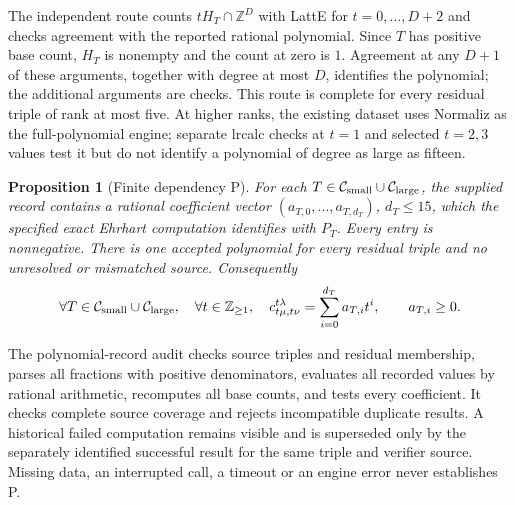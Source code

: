 \documentclass[11pt]{article}
\newtheorem{proposition}[theorem]{Proposition}
\begin{document}
The independent route counts $tH_T\cap\mathbb Z^D$ with LattE for
$t=0,\ldots,D+2$ and checks agreement with the reported rational
polynomial. Since $T$ has positive base count, $H_T$ is nonempty and
the count at zero is $1$. Agreement at any $D+1$ of these arguments,
together with degree at most $D$, identifies the polynomial; the
additional arguments are checks. This route is complete for every
residual triple of rank at most five. At higher ranks, the existing
dataset uses Normaliz as the full-polynomial engine; separate lrcalc
checks at $t=1$ and selected $t=2,3$ values test it but do not identify
a polynomial of degree as large as fifteen.

\begin{proposition}[Finite dependency P]\label{comp:P}
For each $T\in\mathcal C_{\rm small}\cup\mathcal C_{\rm large}$,
the supplied record contains a rational coefficient vector
$(a_{T,0},\ldots,a_{T,d_T})$, $d_T\le15$, which the specified exact
Ehrhart computation identifies with $P_T$. Every entry is nonnegative.
There is one accepted polynomial for every residual triple and no
unresolved or mismatched source. Consequently
\[
 \forall T\in\mathcal C_{\rm small}\cup\mathcal C_{\rm large},\quad
 \forall t\in\mathbb Z_{\ge1},\quad
 c^{t\lambda}_{t\mu,t\nu}=\sum_{i=0}^{d_T}a_{T,i}t^i,
 \qquad a_{T,i}\ge0.
\]
\end{proposition}
The polynomial-record audit checks source triples and residual membership,
parses all fractions with positive denominators, evaluates all recorded
values by rational arithmetic, recomputes all base counts, and tests every
coefficient. It checks complete source coverage and rejects incompatible
duplicate results. A historical failed computation remains visible and
is superseded only by the separately identified successful result for
the same triple and verifier source. Missing data, an interrupted call,
a timeout or an engine error never establishes P.
\end{document}
